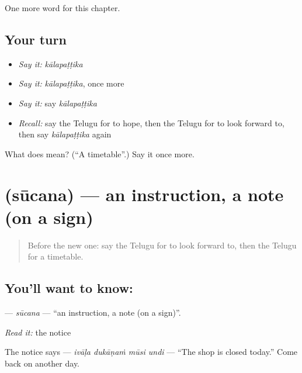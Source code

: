 \begin{grammarlens}[title={What you've built}]
One more word for this chapter.
\end{grammarlens}

\subsection*{Your turn}
\begin{itemize}
\raggedright
  \item \emph{Say it:} \emph{kālapaṭṭika}
  \item \emph{Say it:} \emph{kālapaṭṭika}, once more
  \item \emph{Say it:} say \emph{kālapaṭṭika}
  \item \emph{Recall:} say the Telugu for to hope, then the Telugu for to look forward to, then say \emph{kālapaṭṭika} again
\end{itemize}

\begin{tcolorbox}[breakable,colback=teal!4,colframe=teal!35!black,title={Before you move on}]
What does  mean? (\textquotedblleft{}A timetable\textquotedblright{}.) Say it once more.
\end{tcolorbox}
\section[\texorpdfstring{\te{సూచన} (sūcana)}{సూచన (sūcana)}]{ (sūcana) — an instruction, a note (on a sign)}

\label{lesson:TE-C156-sucana}



\begin{quote}
Before the new one: say the Telugu for to look forward to, then the Telugu for a timetable.
\end{quote}

\subsection*{You'll want to know: }
\textbf{} — \emph{sūcana} — \textquotedblleft{}an instruction, a note (on a sign)\textquotedblright{}.

\emph{Read it:} the notice

The notice says \textbf{   } — \emph{ivāḷa dukāṇaṁ mūsi undi} — \textquotedblleft{}The shop is closed today.\textquotedblright{} Come back on another day.

